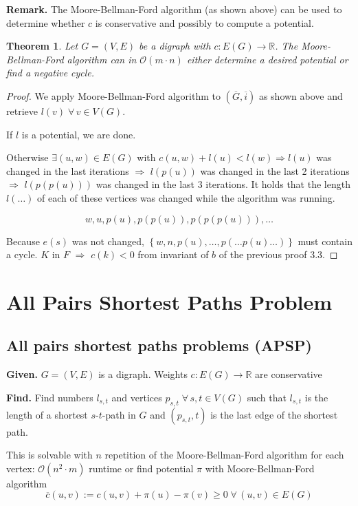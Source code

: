 \documentclass{article}
\newtheorem{theorem}{Theorem}
\newcommand{\set}[1]{\left\{#1\right\}}
\newcommand{\given}[1]{\textbf{Given.} #1\par}
\newcommand{\find}[1]{\textbf{Find.} #1\par}
\newcommand{\gath}[2]{$#1$-$#2$-path} %
\newcommand{\fall}{\;\forall\,}
\begin{document}
\textbf{Remark.}
  The Moore-Bellman-Ford algorithm (as shown above) can be used to determine whether $c$ is conservative and possibly to compute a potential.

\begin{theorem}\label{korollar-3.5}
  Let $G = (V, E)$ be a digraph with $c: E(G) \rightarrow \mathbb{R}$. The Moore-Bellman-Ford algorithm can in $\mathcal{O}(m\cdot n)$ either determine a desired potential or find a negative cycle.
\end{theorem}

\begin{proof}
We apply Moore-Bellman-Ford algorithm to $(\overline{G}, \overline{i})$ as shown above and retrieve $l(v) \fall v \in V(G)$.

If $l$ is a potential, we are done.

Otherwise $\exists (u, w) \in E(G)$ with $c(u, w) + l(u) < l(w) \Rightarrow l(u)$ was changed in the last iterations $\Rightarrow$ $l(p(u))$ was changed in the last 2 iterations $\Rightarrow$ $l(p(p(u)))$ was changed in the last 3 iterations. It holds that the length $l(\ldots)$ of each of these vertices was changed while the algorithm was running.

\[
  w, u, p(u), p(p(u)), p(p(p(u))), \ldots
\]

Because $e(s)$ was not changed, $\set{w, n, p(u), \ldots, p(\ldots p(u) \ldots)}$ must contain a cycle. $K$ in $F$ $\Rightarrow$ $c(k) < 0$ from invariant of $b$ of the previous proof 3.3.
\end{proof}

\section{All Pairs Shortest Paths Problem}
%
\subsection{All pairs shortest paths problems (APSP)}
%
\given{$G = (V, E)$ is a digraph. Weights $c: E(G) \rightarrow \mathbb{R}$ are conservative}
\find{Find numbers $l_{s,t}$ and vertices $p_{s,t} \fall s, t \in V(G)$ such that $l_{s,t}$ is the length of a shortest \gath st in $G$ and $(p_{s,t}, t)$ is the last edge of the shortest path.}

This is solvable with $n$ repetition of the Moore-Bellman-Ford algorithm for each vertex: $\mathcal{O}(n^2 \cdot m)$ runtime or find potential $\pi$ with Moore-Bellman-Ford algorithm
\[
  \overline{c}(u,v) := c(u,v) + \pi(u) - \pi(v) \geq 0 \fall (u, v) \in E(G)
\]
\end{document}
